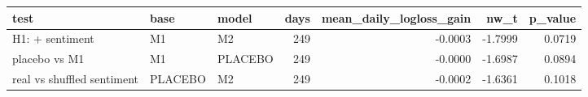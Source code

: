 \begin{tabular}{lllrrrr}
\toprule
test & base & model & days & mean\_daily\_logloss\_gain & nw\_t & p\_value \\
\midrule
H1: + sentiment & M1 & M2 & 249 & -0.0003 & -1.7999 & 0.0719 \\
placebo vs M1 & M1 & PLACEBO & 249 & -0.0000 & -1.6987 & 0.0894 \\
real vs shuffled sentiment & PLACEBO & M2 & 249 & -0.0002 & -1.6361 & 0.1018 \\
\bottomrule
\end{tabular}

